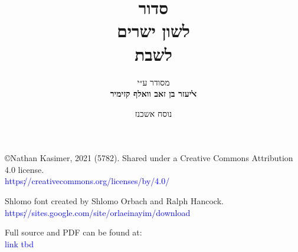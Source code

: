 \documentclass[twoside, openany, parskip=half, 11pt]{book}
\begin{document}
\title{  סדור \\
לשון ישרים\\
\vspace{.5in}
לשבת
}

\author{מסודר ע״י
\\
\textbf{ﭏיעזר בן זאב וואלף קזימיר}}
\date{נוסח אשכנז}

\maketitle

\begin{minipage}{\textwidth}
\begin{english}
\raggedright

©Nathan Kasimer, 2021 (5782). Shared under a Creative Commons Attribution 4.0 license.\\
\textcolor{blue}{https׃//creativecommons.org/licenses/by/4.0/}\\ \vspace{\baselineskip}


Shlomo font created by Shlomo Orbach and Ralph Hancock.\\ \textcolor{blue}{https׃//sites.google.com/site/orlaeinayim/download}\\ \vspace{\baselineskip}

Full \XeLaTeX \quad source and PDF can be found at:\\ \textcolor{blue}{link tbd}\\ \vspace{\baselineskip}


\end{english}
\end{minipage}
\end{document}
